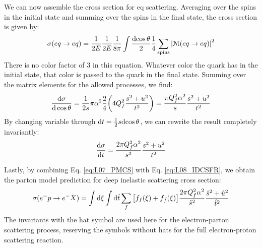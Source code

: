 \documentclass[../../main/main.tex]{subfiles}
\begin{document}
We can now assemble the cross section for eq scattering. Averaging over the spins in the initial state and summing over the spins in the final state, the cross section is given by:
\begin{equation}
	\sigma(eq \rightarrow eq)
	=
	\frac{1}{2E} \frac{1}{2E} \frac{1}{8\pi}
	\int \frac{\mathrm{d}{\cos \theta}}{2} \frac{1}{4}
	\sum_{\text{spins}} \abs{\mathcal{M}(eq \rightarrow eq)}^2
	\label{eq:L08_EQSCSFR}
\end{equation}
There is no color factor of 3 in this equation. Whatever color the quark has in the initial state, that color is passed to the quark in the final state. Summing over the matrix elements for the allowed processes, we find:
\begin{equation}
	\dv{\sigma}{\cos \theta}
	=
	\frac{1}{2s} \pi \alpha^2 \frac{2}{4} \qty(4Q^2_f \frac{s^2 + u^2}{t^2})
	=
	\frac{\pi Q^2_f \alpha^2}{s} \frac{s^2 + u^2}{t^2}
	\label{eq:L08_DCSFR}
\end{equation}
By changing variable through \( \mathrm{d}{t} = \frac{1}{2} s \mathrm{d}{\cos \theta} \), we can rewrite the result completely invariantly:
\begin{equation}
	\dv{\sigma}{t}(eq \rightarrow eq)
	=
	\frac{2\pi Q^2_f \alpha^2}{s^2} \frac{s^2 + u^2}{t^2}
	\label{eq:L08_IDCSFR}
\end{equation}

Lastly, by combining Eq. \ref{eq:L07_PMCS} with Eq. \ref{eq:L08_IDCSFR}, we obtain the parton model prediction for deep inelastic scattering cross section:
\begin{equation}
	\sigma(e^-p \rightarrow e^-X)
	=
	\int\mathrm{d}{\xi} \int\mathrm{d}{\hat{t}} \sum_{f} \qty[f_f(\xi) + f_{\bar{f}}(\xi)] \frac{2\pi Q^2_f \alpha^2}{\hat{s}^2} \frac{\hat{s}^2 + \hat{u}^2}{\hat{t}^2}
	\label{eq:L08_DISCSPMP}
\end{equation}
The invariants with the hat symbol are used here for the electron-parton scattering process, reserving the symbols without hats for the full electron-proton scattering reaction.
\end{document}

